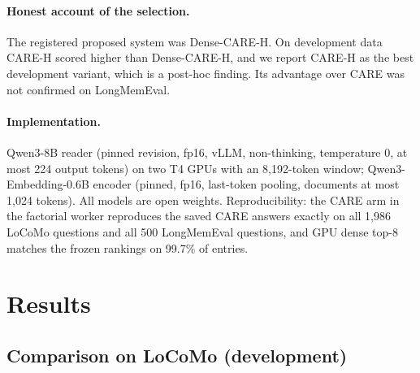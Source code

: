 \documentclass[10pt]{article}
\theoremstyle{plain}
\begin{document}
\paragraph{Honest account of the selection.} The registered proposed system was Dense-CARE-H. On development
data CARE-H scored higher than Dense-CARE-H, and we report CARE-H as the best development variant, which
is a post-hoc finding. Its advantage over CARE was not confirmed on LongMemEval.

\paragraph{Implementation.} Qwen3-8B reader (pinned revision, fp16, vLLM, non-thinking, temperature 0,
at most 224 output tokens) on two T4 GPUs with an 8,192-token window; Qwen3-Embedding-0.6B encoder (pinned,
fp16, last-token pooling, documents at most 1,024 tokens). All models are open weights. Reproducibility:
the CARE arm in the factorial worker reproduces the saved CARE answers exactly on all 1,986 LoCoMo questions
and all 500 LongMemEval questions, and GPU dense top-8 matches the frozen rankings on 99.7\% of entries.

\section{Results}
\label{sec:results}

\subsection{Comparison on LoCoMo (development)}
\end{document}
